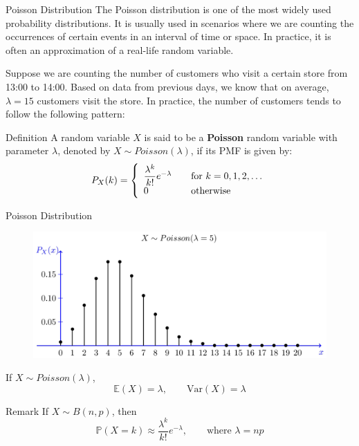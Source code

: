 \documentclass{beamer}
\newcommand{\E}{\mathbb{E}}
\newcommand{\PP}{\mathbb{P}}
\newcommand{\Var}{\text{Var}}
\begin{document}
	
	
	\begin{frame}{Poisson Distribution}
		The Poisson distribution is one of the most widely used probability distributions. It is usually used in scenarios where we are counting the occurrences of certain events in an interval of time or space. In practice, it is often an approximation of a real-life random variable. \pause
		
		Suppose we are counting the number of customers who visit a certain store from 13:00 to 14:00. Based on data from previous days, we know that on average, $\lambda=15$ customers visit the store. \pause In practice, the number of customers tends to follow the following pattern:
		\pause
		\begin{block}{Definition}
			A random variable $X$ is said to be a \textbf{Poisson} random variable with parameter $\lambda$, denoted by $X\sim Poisson(\lambda)$, if its PMF is given by:
			\begin{equation}
				\nonumber P_X(k) = \left\{
				\begin{array}{l l}
				\dfrac{\lambda^k}{k!}	e^{-\lambda} & \quad \text{for } k=0, 1, 2, \dots\\
					0 & \quad \text{otherwise}
				\end{array} \right.
			\end{equation}
		\end{block}
		
	\end{frame}
	\begin{frame}{Poisson Distribution}
\begin{figure}
	\centering
	\label{fig:0}
	\includegraphics[width=0.6\linewidth]{0.39}
\end{figure}
		\pause
		If $X\sim Poisson(\lambda)$,
		\[ \E(X) = \lambda,\qquad \Var(X)=\lambda \]
		\pause
		\begin{block}{Remark}
		If $X\sim B(n, p)$, then
		\[\PP(X = k) \approx \frac{\lambda^k}{k!}e^{-\lambda},\qquad \text{where }\lambda = np\]
		\end{block}
		
	\end{frame}
	
\end{document}
